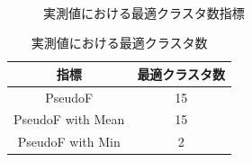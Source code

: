 \documentclass[a4j]{jarticle}
\begin{document}
\begin{figure}[tb]
\begin{center}
~
~
\caption{実測値における最適クラスタ数指標}
\label{normPseudoF}
\end{center}
\end{figure}

\begin{table}[tb]
\centering
\caption{実測値における最適クラスタ数}
\label{normPseudoFresult}
\begin{tabular}{|c|c|}
\hline
指標&最適クラスタ数\\
\hline
PseudoF&15\\
\hline
PseudoF with Mean&15\\
\hline
PseudoF with Min&2\\
\hline
\end{tabular}
\end{table}
\end{document}
